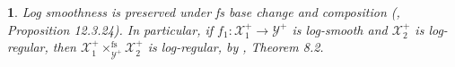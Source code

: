\documentclass{amsart}%
\numberwithin{equation}{subsection}
\theoremstyle{plain2}
\newtheorem{prop}[equation]{Proposition}
\theoremstyle{definition2}
\theoremstyle{stepstyle}
\theoremstyle{point}
\theoremstyle{subpoint}
\newtheorem{subpoint}[equation]{}%
\newcommand{\spa}[1]{\begin{subpoint}#1\end{subpoint}}           %
\newcommand{\cX}{\ensuremath{\mathscr{X}}}
\newcommand{\cY}{\ensuremath{\mathscr{Y}}}
\renewcommand{\cY}{\ensuremath{\mathscr{Y}}}
\begin{document}
\spa{Log smoothness is preserved under fs base change and composition (\cite{GabberRamero}, Proposition 12.3.24). In particular, if $f_1: \cX_1^+ \rightarrow \cY^+$ is log-smooth and $\cX_2^+$ is log-regular, then $\cX_1^+\times^{\text{fs}}_{\cY^+} \cX_2^+$ is log-regular, by \cite{Kato1994a}, Theorem 8.2.

%
%
}
\end{document}
